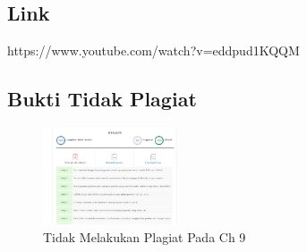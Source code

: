 \subsection{Link}
https://www.youtube.com/watch?v=eddpud1KQQM

\subsection{Bukti Tidak Plagiat}

\begin{figure}[H]
    \includegraphics[width=4cm]{figures/1174079/9/bukti.png}
    \centering
    \caption{Tidak Melakukan Plagiat Pada Ch 9}
\end{figure}